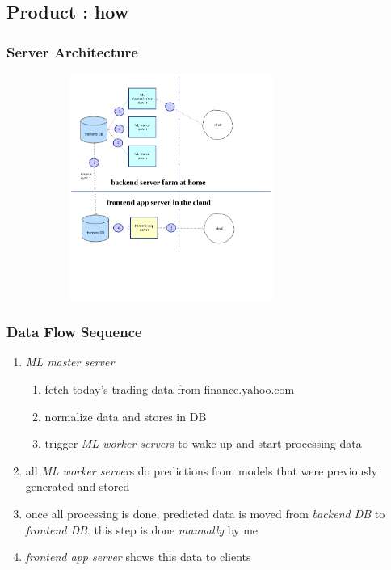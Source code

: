 \documentclass{beamer}
\begin{document}
\subsection{Product : how}
\begin{frame}
  \frametitle{Server Architecture}
  \includegraphics[height=7.4cm,width=10.8cm]{stox_architecture.png}
\end{frame}
\begin{frame}
  \frametitle{Data Flow Sequence}
  \begin{enumerate}
  \item \textit{ML master server}
    \begin{enumerate}
    \item fetch today's trading data from finance.yahoo.com
    \item normalize data and stores in DB
    \item trigger \textit{ML worker server}s to wake up and start processing data
    \end{enumerate}
  \item all \textit{ML worker server}s do predictions from models that were previously generated and stored
  \item once all processing is done, predicted data is moved from \textit{backend DB} to \textit{frontend DB}. this step is done \textit{manually} by me
  \item \textit{frontend app server} shows this data to clients
  \end{enumerate}
\end{frame}
\end{document}
